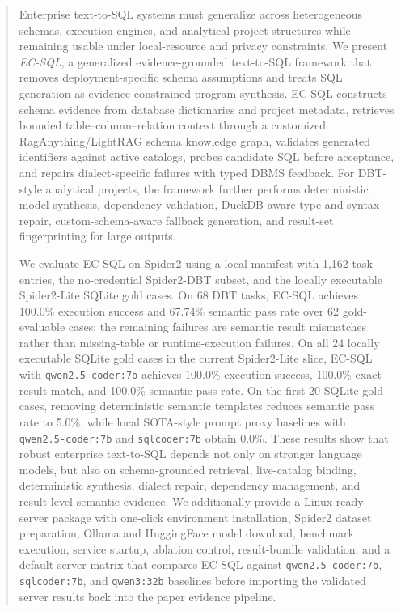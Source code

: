 \begin{abstract}
Enterprise text-to-SQL systems must generalize across heterogeneous schemas,
execution engines, and analytical project structures while remaining usable
under local-resource and privacy constraints. We present \emph{EC-SQL}, a
generalized evidence-grounded text-to-SQL framework that removes
deployment-specific schema assumptions and treats SQL generation as
evidence-constrained program synthesis. EC-SQL constructs schema evidence
from database dictionaries and project metadata, retrieves bounded
table--column--relation context through a customized RagAnything/LightRAG
schema knowledge graph, validates generated identifiers against active
catalogs, probes candidate SQL before acceptance, and repairs dialect-specific
failures with typed DBMS feedback. For DBT-style analytical projects, the
framework further performs deterministic model synthesis, dependency
validation, DuckDB-aware type and syntax repair, custom-schema-aware fallback
generation, and result-set fingerprinting for large outputs.

We evaluate EC-SQL on Spider2 using a local manifest with 1,162 task
entries, the no-credential Spider2-DBT subset, and the locally executable
Spider2-Lite SQLite gold cases. On 68 DBT tasks, EC-SQL achieves 100.0\%
execution success and 67.74\% semantic pass rate over 62 gold-evaluable cases;
the remaining failures are semantic result mismatches rather than
missing-table or runtime-execution failures. On all 24 locally executable
SQLite gold cases in the current Spider2-Lite slice, EC-SQL with
\texttt{qwen2.5-coder:7b} achieves 100.0\% execution success, 100.0\% exact
result match, and 100.0\% semantic pass rate. On the first 20 SQLite gold
cases, removing deterministic semantic templates reduces semantic pass rate to
5.0\%, while local SOTA-style prompt proxy baselines with
\texttt{qwen2.5-coder:7b} and \texttt{sqlcoder:7b} obtain 0.0\%. These results
show that robust enterprise text-to-SQL depends not only on stronger language
models, but also on schema-grounded retrieval, live-catalog binding,
deterministic synthesis, dialect repair, dependency management, and
result-level semantic evidence. We additionally provide a Linux-ready server
package with one-click environment installation, Spider2 dataset preparation,
Ollama and HuggingFace model download, benchmark execution, service startup,
ablation control, result-bundle validation, and a default server matrix that
compares EC-SQL against \texttt{qwen2.5-coder:7b}, \texttt{sqlcoder:7b},
and \texttt{qwen3:32b} baselines before importing the validated server results
back into the paper evidence pipeline.
\end{abstract}
